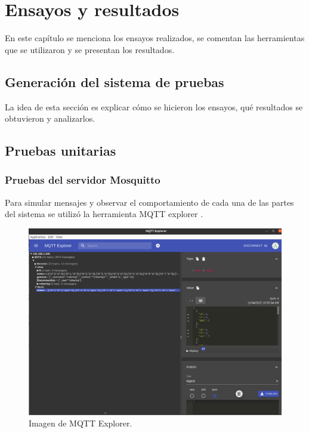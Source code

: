 
\chapter{Ensayos y resultados} %

En este capítulo se menciona los ensayos realizados, se comentan las herramientas que se utilizaron y se presentan los resultados.

\label{Chapter4} %


\section{Generación del sistema de pruebas}
\label{sec:pruebasHW}

La idea de esta sección es explicar cómo se hicieron los ensayos, qué resultados se obtuvieron y analizarlos.
\section{Pruebas unitarias}
\subsection{Pruebas del servidor Mosquitto}
Para simular mensajes y observar el comportamiento de cada una de las partes del sistema se utilizó la herramienta MQTT explorer   \citep{WEBSITE:29}.

\begin{figure}[ht]
	\centering
	\includegraphics[scale=.25]{./Figures/mqtt-explorer.png}
	\caption{Imagen de MQTT Explorer.}
	\label{fig:MQTT Explorer}
\end{figure}

